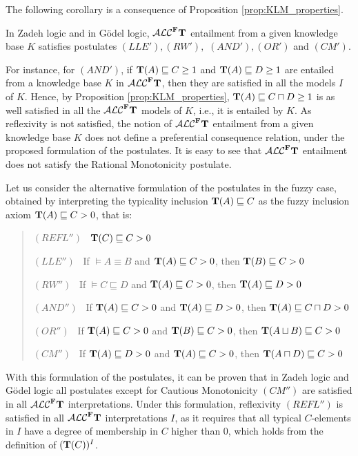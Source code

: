 \documentclass[runningheads]{llncs}
\newcommand{\tip}{{\bf T}}
\newcommand{\alcFt}{\mathcal{ALC}^{\Fe}\tip}
\newcommand {\Fe} {{\bf F}}
\begin{document}
The following corollary is a consequence of Proposition \ref{prop:KLM_properties}.
\begin{corollary}
In Zadeh logic and in G\"odel logic, $\alcFt$ entailment from a given knowledge base $K$ satisfies postulates $ (LLE'), (RW'),$ $ (AND'), (OR')$ and $(CM')$.
\end{corollary}
For instance, for $(AND')$, if $\tip(A) \sqsubseteq C \geq 1 $ and $\tip(A) \sqsubseteq D \geq 1$ are entailed from a knowledge base $K$ in $\alcFt$, then they are satisfied in all the models $I$ of $K$. Hence,  by Proposition  \ref{prop:KLM_properties}, $\tip(A) \sqsubseteq C \sqcap D \geq 1$ is as well satisfied in all the $\alcFt$ models of $K$, i.e., it is entailed by $K$.
As reflexivity is not satisfied, the notion of $\alcFt$ entailment from a given knowledge base $K$ does not define a preferential consequence relation, under the proposed formulation of the postulates.
It is easy to see that $\alcFt$ entailment  does not satisfy the Rational Monotonicity postulate.

Let us consider the alternative formulation of the postulates in the fuzzy case, obtained by interpreting the typicality inclusion $\tip(A) \sqsubseteq C $ as the fuzzy inclusion axiom $\tip(A) \sqsubseteq C > 0$, that is:

\begin{quote}
$(REFL'')$ \ $\tip(C) \sqsubseteq C >0$ 


$(LLE'')$ \ If 
$\models A \equiv B$  and $\tip(A) \sqsubseteq C > 0$, then $\tip(B) \sqsubseteq C  > 0$ 

$(RW'')$ \  If $\models C \sqsubseteq D$ and $\tip(A) \sqsubseteq C  > 0$, then $\tip(A) \sqsubseteq D  > 0$ 

$(AND'')$ \ If $\tip(A) \sqsubseteq C > 0 $ and $\tip(A) \sqsubseteq D > 0$, then $\tip(A) \sqsubseteq C \sqcap D > 0$

$(OR'')$ \ If $\tip(A) \sqsubseteq C > 0$ and $\tip(B) \sqsubseteq C > 0$, then $\tip(A \sqcup B) \sqsubseteq C > 0$

$(CM'')$ \  If $\tip(A) \sqsubseteq D > 0$ and $\tip(A) \sqsubseteq C > 0$, then $\tip(A \sqcap D) \sqsubseteq C > 0$ 
\end{quote}
With this formulation of the postulates, it can be proven that 
in Zadeh logic and G\"odel logic all postulates except for Cautious Monotonicity $(CM'')$ are satisfied in all $\alcFt$ interpretations. 
Under this formulation,  reflexivity $(REFL'')$ is satisfied in all  $\alcFt$ interpretations $I$,
as it requires that all typical $C$-elements in $I$ have a degree of membership in $C$ higher than $0$, which holds 
from the definition of $(\tip(C))^I$.
\end{document}
